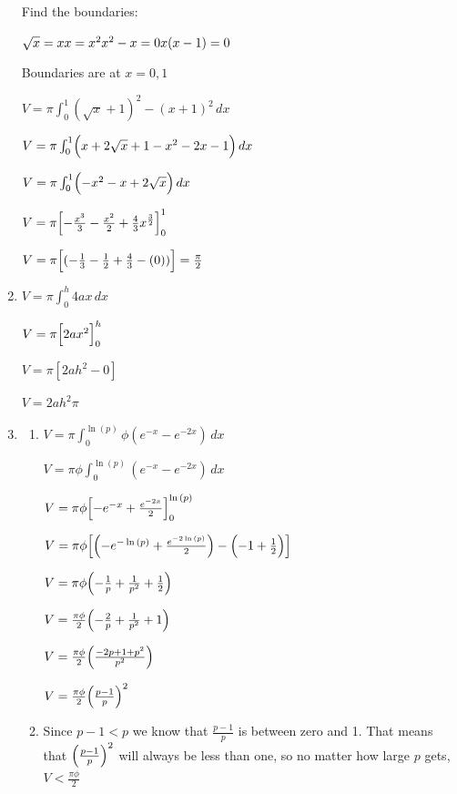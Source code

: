 \documentclass[../main.tex]{subfiles}
\begin{document}
\begin{spacing}{1.5}
\begin{enumerate}[itemsep=0.7cm]
    Find the boundaries:

    $\sqrt{x}=x\\
    x=x^2\\
    x^2-x=0\\
    x(x-1)=0$

    Boundaries are at $x=0, 1$

    $V=\pi \int_0^1 (\sqrt{x}+1)^2-(x+1)^2\,dx$

    $V=\pi \int_0^1 \Bigl(x+2\sqrt{x}+1-x^2-2x-1\Bigr)\,dx$

    $V=\pi \int_0^1 \Bigl(-x^2 -x+2\sqrt{x}\Bigr)\,dx$

    $V=\pi \Bigl[-\frac{x^3}{3}-\frac{x^2}{2}+\frac{4}{3}x^{\frac{3}{2}}\Bigr]_0^1$

    $V=\pi \Bigl[(-\frac{1}{3}-\frac{1}{2}+\frac{4}{3}-(0))\Bigr]=\frac{\pi}{2}$

    \item 
    $V=\pi \int_0^h 4ax\,dx$

    $V=\pi \Bigl[2ax^2\Bigr]_0^h$

    $V=\pi [2ah^2 - 0]$

    $V=2ah^2\pi$

    \item 
    \begin{enumerate}
        \item 
        $V=\pi \int_0^{\ln{(p)}} \phi(e^{-x}-e^{-2x})\,dx$
    
        $V=\pi \phi\int_0^{\ln{(p)}} (e^{-x}-e^{-2x})\,dx$
    
        $V=\pi \phi \Bigl[-e^{-x}+\frac{e^{-2x}}{2}\Bigr]_0^{\ln{(p)}}$

        $V=\pi \phi \Bigl[\Bigl(-e^{-\ln{(p)}}+\frac{e^{-2\ln{(p)}}}{2}\Bigr)-\Bigl(-1+\frac{1}{2}\Bigr)\Bigr]$

        $V=\pi \phi \Bigl(-\frac{1}{p}+\frac{1}{p^2}+\frac{1}{2}\Bigr)$

        $V=\frac{\pi \phi}{2}\Bigl(-\frac{2}{p}+\frac{1}{p^2}+1\Bigr)$

        $V=\frac{\pi \phi}{2}\Bigl(\frac{-2p+1+p^2}{p^2}\Bigr)$

        $V=\frac{\pi \phi}{2}\Bigl(\frac{p-1}{p}\Bigr)^2$
    
        \item Since $p-1<p$ we know that $\frac{p-1}{p}$ is between zero and 1. That means that $\Bigl(\frac{p-1}{p}\Bigr)^2$ will always be less than one, so no matter how large $p$ gets, $V<\frac{\pi \phi}{2}$
    
    \end{enumerate}
    

\end{enumerate}
\end{spacing}
\end{document}
